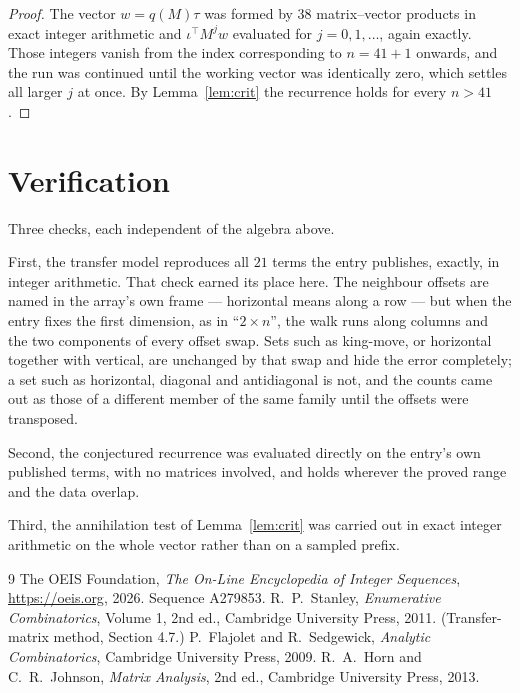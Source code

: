 \documentclass[11pt,a4paper]{article}
\theoremstyle{plain}
\theoremstyle{definition}
\begin{document}
\begin{proof}
The vector $w=q(M)\tau$ was formed by $38$ matrix--vector products in exact integer
arithmetic and $\iota^{\!\top}M^{j}w$ evaluated for $j=0,1,\dots$, again exactly. Those
integers vanish from the index corresponding to $n=41+1$ onwards, and the run was
continued until the working vector was identically zero, which settles all larger $j$ at once.
By Lemma~\ref{lem:crit} the recurrence holds for every $n>41$.
\end{proof}

\section{Verification}

Three checks, each independent of the algebra above.

First, the transfer model reproduces all $21$ terms the entry publishes, exactly, in
integer arithmetic. That check earned its place here. The neighbour offsets are named in the
array's own frame --- horizontal means along a row --- but when the entry fixes the first
dimension, as in ``$2\times n$'', the walk runs along columns and the two components of every
offset swap. Sets such as king-move, or horizontal together with vertical, are unchanged by
that swap and hide the error completely; a set such as horizontal, diagonal and antidiagonal
is not, and the counts came out as those of a different member of the same family until the
offsets were transposed.

Second, the conjectured recurrence was evaluated directly on the entry's own published terms,
with no matrices involved, and holds wherever the proved range and the data overlap.

Third, the annihilation test of Lemma~\ref{lem:crit} was carried out in exact integer
arithmetic on the whole vector rather than on a sampled prefix.

\begin{thebibliography}{9}
 The OEIS Foundation, \emph{The On-Line Encyclopedia of Integer
Sequences}, \url{https://oeis.org}, 2026. Sequence A279853.
 R.~P.~Stanley, \emph{Enumerative Combinatorics}, Volume 1, 2nd ed.,
Cambridge University Press, 2011. (Transfer-matrix method, Section 4.7.)
 P.~Flajolet and R.~Sedgewick, \emph{Analytic Combinatorics}, Cambridge
University Press, 2009.
 R.~A.~Horn and C.~R.~Johnson, \emph{Matrix Analysis}, 2nd ed., Cambridge
University Press, 2013.
\end{thebibliography}
\end{document}
